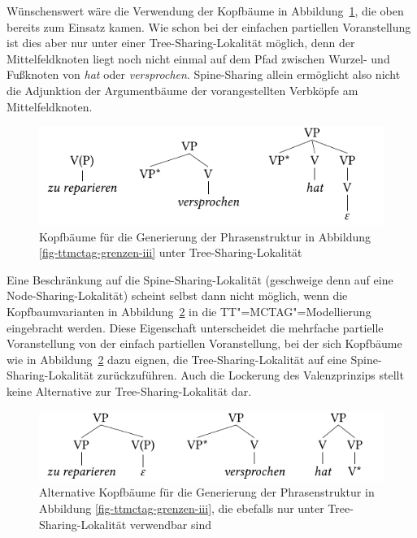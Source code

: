 Wünschenswert wäre die Verwendung der Kopfbäume in Abbildung~\ref{fig-ttmctag-grenzen-iii-2}, die oben bereits zum Einsatz kamen. Wie schon bei der einfachen partiellen Voranstellung ist dies aber nur unter einer Tree-Sharing-Lokalität möglich, denn der Mittelfeldknoten liegt noch nicht einmal auf dem Pfad zwischen Wurzel- und Fu\ss knoten von {\it hat} oder {\it versprochen}. Spine-Sharing allein ermöglicht also nicht die Adjunktion der Argumentbäume der vorangestellten Verbköpfe am Mittelfeldknoten.
\begin{figure}[t]
\centering
\includegraphics{graphics/abb737.pdf}
\caption{\label{fig-ttmctag-grenzen-iii-2}Kopfbäume für die Generierung der Phrasenstruktur in Abbildung \ref{fig-ttmctag-grenzen-iii} unter Tree-Sharing-Lokalität}
\end{figure}
Eine Beschränkung auf die Spine-Sharing-Lokalität (geschweige denn auf eine Node-Sharing-Lokalität) scheint selbst dann nicht möglich, wenn die Kopfbaumvarianten in Abbildung~\ref{fig-ttmctag-grenzen-iii-3} in die TT"=MCTAG"=Modellierung eingebracht werden. Diese Eigenschaft unterscheidet die mehrfache partielle Voranstellung von der einfach partiellen Voranstellung, bei der sich Kopfbäume wie in Abbildung~\ref{fig-ttmctag-grenzen-iii-3} dazu eignen, die Tree-Sharing-Lokalität auf eine Spine-Sharing-Lokalität zurückzuführen. Auch die Lockerung des Valenzprinzips stellt keine Alternative zur Tree-Sharing-Lokalität dar. 
\begin{figure}[t]
\centering
\includegraphics{graphics/abb738.pdf}
\caption{\label{fig-ttmctag-grenzen-iii-3}Alternative Kopfbäume für die Generierung der Phrasenstruktur in Abbildung \ref{fig-ttmctag-grenzen-iii}, die ebefalls nur unter Tree-Sharing-Lokalität verwendbar sind}
\end{figure}
 


